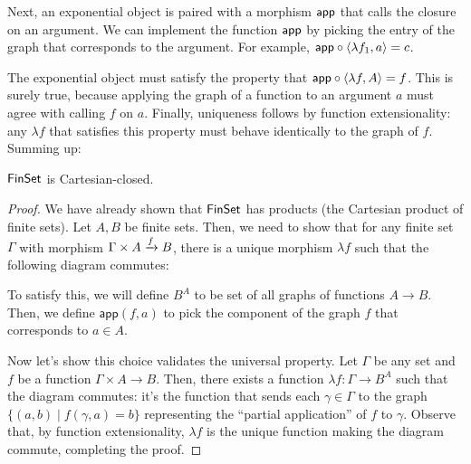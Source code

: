 Next, an exponential object is paired with a morphism $\mathsf{app}$
that calls the closure on an argument. We can implement
the function $\mathsf{app}$ by picking the entry of the graph that corresponds
to the argument. For example, $\mathsf{app} \circ \langle \lambda f_1, a \rangle = c$.

The exponential object must satisfy the property that $\mathsf{app} \circ \langle
\lambda f, A \rangle = f$. This is surely true, because applying the graph of a
function to an argument $a$ must agree with calling $f$ on $a$.
Finally, uniqueness follows by function extensionality: any $\lambda f$
that satisfies this property must behave identically to the graph of $f$.
Summing up:

\begin{proposition}
  $\mathsf{FinSet}$ is Cartesian-closed.
\end{proposition}
\begin{proof}
  We have already shown that $\mathsf{FinSet}$ has products (the Cartesian product of
  finite sets). Let $A, B$ be finite sets. Then, we need to show that for
  any finite set $\Gamma$ with morphism $\Gamma \times A \xrightarrow{f} B$,
  there is a unique morphism $\lambda f$ such that the following diagram commutes:

  \begin{center}
  \end{center}

  To satisfy this, we will define $B^A$ to be set of all graphs of functions $A
  \to B$.
  Then, we define $\mathsf{app}(f, a)$ to pick the component of the
  graph $f$ that corresponds to $a \in A$.

  Now let's show this choice validates the universal property.  Let $\Gamma$ be
  any set and $f$ be a function $\Gamma \times A \to B$. Then, there
  exists a function $\lambda f : \Gamma \to B^A$ such that the diagram commutes:
  it's the function that sends each \(\gamma \in \Gamma\)
  to the graph \(\{(a,b) \mid f(\gamma,a) = b\}\)
  representing the ``partial application'' of \(f\) to \(\gamma\).
  Observe that, by function extensionality, $\lambda f$ is the unique function
  making the diagram commute, completing the proof.
\end{proof}

